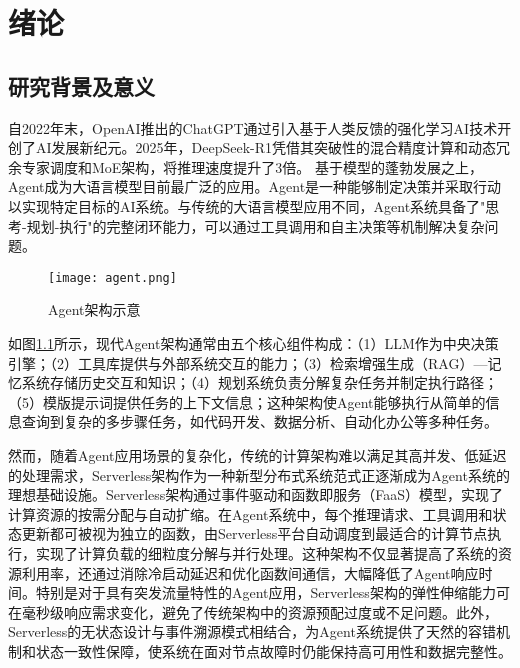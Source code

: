 \chapter{绪论}

\section{研究背景及意义}
\label{sec:1.1}

自2022年末，OpenAI推出的ChatGPT通过引入基于人类反馈的强化学习AI技术开创了AI发展新纪元\cite{NEURIPS2022_b1efde53}。2025年，DeepSeek-R1凭借其突破性的混合精度计算和动态冗余专家调度和MoE架构\cite{zhao2025insightsdeepseekv3scalingchallenges}，将推理速度提升了3倍。
基于模型的蓬勃发展之上，Agent成为大语言模型目前最广泛的应用。Agent是一种能够制定决策并采取行动以实现特定目标的AI系统。与传统的大语言模型应用不同，Agent系统具备了"思考-规划-执行"的完整闭环能力，可以通过工具调用和自主决策等机制解决复杂问题\cite{osti_10451467,NEURIPS2023_d842425e}。

\begin{figure}[h]
    \centering
    \texttt{[image: agent.png]}
    \caption{Agent架构示意}
    \label{fig:agent_arch}
\end{figure}

如图\ref{fig:agent_arch}所示，现代Agent架构通常由五个核心组件构成：（1）LLM作为中央决策引擎；（2）工具库提供与外部系统交互的能力；（3）检索增强生成（RAG）—记忆系统存储历史交互和知识；（4）规划系统负责分解复杂任务并制定执行路径；（5）模版提示词提供任务的上下文信息；这种架构使Agent能够执行从简单的信息查询到复杂的多步骤任务，如代码开发、数据分析、自动化办公等多种任务。

然而，随着Agent应用场景的复杂化，传统的计算架构难以满足其高并发、低延迟的处理需求，Serverless架构作为一种新型分布式系统范式正逐渐成为Agent系统的理想基础设施。Serverless架构通过事件驱动和函数即服务（FaaS）模型，实现了计算资源的按需分配与自动扩缩\cite{Baldini2017,jonas2019cloudprogrammingsimplifiedberkeley}。在Agent系统中，每个推理请求、工具调用和状态更新都可被视为独立的函数，由Serverless平台自动调度到最适合的计算节点执行，实现了计算负载的细粒度分解与并行处理。这种架构不仅显著提高了系统的资源利用率，还通过消除冷启动延迟和优化函数间通信，大幅降低了Agent响应时间。特别是对于具有突发流量特性的Agent应用，Serverless架构的弹性伸缩能力可在毫秒级响应需求变化，避免了传统架构中的资源预配过度或不足问题。此外，Serverless的无状态设计与事件溯源模式相结合，为Agent系统提供了天然的容错机制和状态一致性保障，使系统在面对节点故障时仍能保持高可用性和数据完整性。


